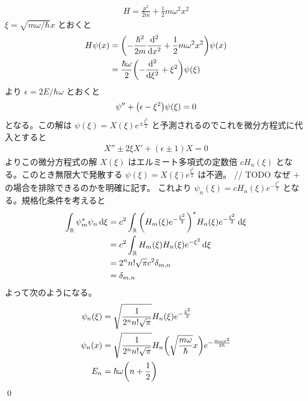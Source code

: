 \documentclass[uplatex,dvipdfmx,a4paper,11pt]{jlreq}
\makeatletter
\newcommand{\RR}{\mathbb{R}}
\numberwithin{equation}{section}
\theoremstyle{definition}
\renewenvironment{proof}[1][\proofname]{\par
  \normalfont
  \topsep6\p@\@plus6\p@ \trivlist
  \item[\hskip\labelsep{\bfseries #1}\@addpunct{\bfseries}]\ignorespaces\quad\par
}{%
  \qed\endtrivlist\@endpefalse
}
\renewcommand\proofname{証明}
\makeatother
\begin{document}
\begin{proof}
  \begin{align}
    H = \frac{p^2}{2m} + \frac{1}{2}m\omega^2x^2
  \end{align}
  $\xi = \sqrt{m\omega/\hbar}x$ とおくと
  \begin{align}
    H\psi(x) & = \qty(-\frac{\hbar^2}{2m}\dv[2]{x} + \frac{1}{2}m\omega^2x^2)\psi(x) \\
             & = \frac{\hbar\omega}{2}\qty(-\dv[2]{\xi} + \xi^2)\psi(\xi)
  \end{align}
  より $\epsilon = 2E/\hbar\omega$ とおくと
  \begin{align}
    \psi'' + \qty(\epsilon - \xi^2)\psi(\xi) = 0
  \end{align}
  となる。この解は $\psi(\xi) = X(\xi)e^{\pm\frac{\xi^2}{2}}$ と予測されるのでこれを微分方程式に代入とすると
  \begin{align}
    X'' \pm 2\xi X' + (\epsilon\pm 1)X = 0
  \end{align}
  よりこの微分方程式の解 $X(\xi)$ はエルミート多項式の定数倍 $cH_n(\xi)$ となる。このとき無限大で発散する $\psi(\xi) = X(\xi)e^{\frac{\xi^2}{2}}$ は不適。
  // TODO なぜ $+$ の場合を排除できるのかを明確に記す。
  これより $\psi_n(\xi) = cH_n(\xi)e^{-\frac{\xi^2}{2}}$ となる。規格化条件を考えると
  \begin{align}
    \int_\RR \psi_m^*\psi_n\dd{\xi} & = c^2\int_\RR \qty(H_m(\xi)e^{-\frac{\xi^2}{2}})^*H_n(\xi)e^{-\frac{\xi^2}{2}}\dd{\xi} \\
                                    & = c^2\int_\RR H_m(\xi)H_n(\xi)e^{-\xi^2}\dd{\xi}                                       \\
                                    & = 2^nn!\sqrt{\pi}c^2\delta_{m, n}                                                      \\
                                    & = \delta_{m, n}
  \end{align}
  よって次のようになる。
  \begin{align}
    \psi_n(\xi) & = \sqrt{\frac{1}{2^nn!\sqrt{\pi}}}H_n(\xi)e^{-\frac{\xi^2}{2}}                                          \\
    \psi_n(x)   & = \sqrt{\frac{1}{2^nn!\sqrt{\pi}}}H_n\qty(\sqrt{\frac{m\omega}{\hbar}}x)e^{-\frac{m\omega x^2}{2\hbar}} \\
    E_n         & = \hbar\omega\qty(n + \frac{1}{2})
  \end{align}
\end{proof}
\end{document}
